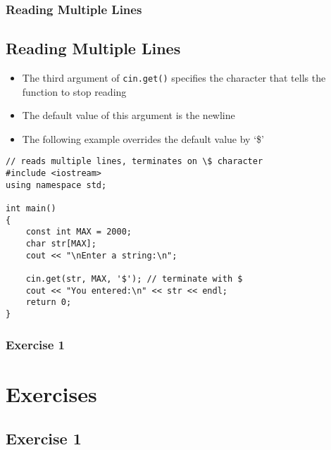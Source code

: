 \documentclass{beamer}
\begin{document}
\begin{frame}[fragile]\frametitle{Reading Multiple Lines}
\subsection{Reading Multiple Lines} %
\label{sub:reading_multiple_lines}
\begin{itemize}
    \item The third argument of \texttt{cin.get()} specifies the character that tells the function to stop reading
    \item The default value of this argument is the newline
    \item The following example overrides the default value by `\$'
\end{itemize}
    \lstset{style=mystyle}
\begin{lstlisting}
// reads multiple lines, terminates on \$ character
#include <iostream>
using namespace std;

int main()
{
    const int MAX = 2000;
    char str[MAX];
    cout << "\nEnter a string:\n";

    cin.get(str, MAX, '$'); // terminate with $
    cout << "You entered:\n" << str << endl;
    return 0;
}
\end{lstlisting}
\end{frame}

\begin{frame}\frametitle{Exercise 1}
    \section{Exercises} %
    \label{sec:exercises}
    \subsection{Exercise 1} %
    \label{sub:exercise_1}


\end{frame}
\end{document}
